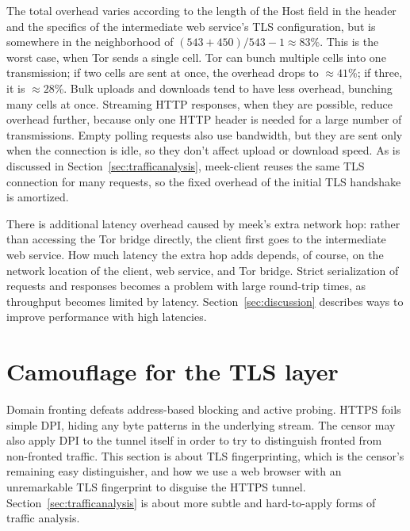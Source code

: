 \documentclass[conference]{IEEEtran}
\newcommand{\meekclient}{\mbox{meek-client}\xspace}
\begin{document}
\noindent
The total overhead varies according to the length
of the Host field in the header and the specifics of the intermediate web service's TLS configuration,
but is somewhere in the neighborhood of $(543+450)/543-1\approx83$\%.
This is the worst case, when Tor sends a single cell.
Tor can bunch multiple cells into one transmission;
if two cells are sent at once, the overhead drops to
${\approx}41$\%; if three, it is ${\approx}28$\%.
Bulk uploads and downloads tend to have less overhead, bunching many cells at once.
Streaming HTTP responses, when they are possible, reduce overhead further,
because only one HTTP header is needed for a large number of transmissions.
Empty polling requests also use bandwidth,
but they are sent only when the connection is idle,
so they don't affect upload or download speed.
As is discussed in Section~\ref{sec:trafficanalysis},
\meekclient reuses the same TLS connection for many requests,
so the fixed overhead of the initial TLS handshake is amortized.


There is additional latency overhead caused by meek's extra network hop:
rather than accessing the Tor bridge directly,
the client first goes to the intermediate web service.
How much latency the extra hop adds depends, of course, on the network location
of the client, web service, and Tor bridge.
Strict serialization of requests and responses
becomes a problem with large round-trip times,
as throughput becomes limited by latency.
Section~\ref{sec:discussion} describes ways to improve
performance with high latencies.

\section{Camouflage for the TLS layer}
\label{sec:browserextension}

Domain fronting defeats address-based blocking and active probing.
HTTPS foils simple DPI,
hiding any byte patterns in the underlying stream.
The censor may also apply DPI to the tunnel itself in order to try to
distinguish fronted from non-fronted traffic.
This section is about TLS fingerprinting,
which is the censor's remaining easy distinguisher,
and how we use a web browser with an unremarkable TLS fingerprint
to disguise the HTTPS tunnel.
Section~\ref{sec:trafficanalysis} is about more subtle and hard-to-apply forms of traffic analysis.
\end{document}
